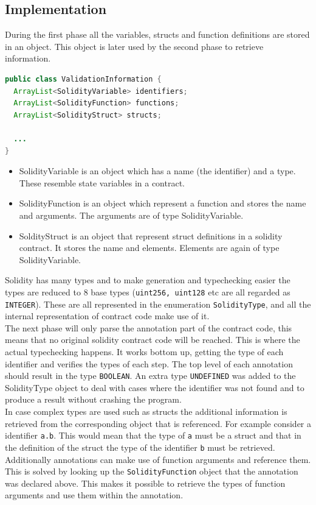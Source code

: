 \documentclass[a4paper]{article}
\begin{document}
\subsection{Implementation}
During the first phase all the variables, structs and function definitions are stored in an object. This object is later used by the second phase to retrieve information.
\begin{lstlisting}[breaklines=true, language=Java ]
public class ValidationInformation {
  ArrayList<SolidityVariable> identifiers;
  ArrayList<SolidityFunction> functions;
  ArrayList<SolidityStruct> structs;

  ...
}
\end{lstlisting}
\begin{itemize}
  \item SolidityVariable is an object which has a name (the identifier) and a type. These resemble state variables in a contract.
  \item SolidityFunction is an object which represent a function and stores the name and arguments. The arguments are of type SolidityVariable.
  \item SoldityStruct is an object that represent struct definitions in a solidity contract. It stores the name and elements. Elements are again of type SolidityVariable.
\end{itemize}
Solidity has many types and to make generation and typechecking easier the types are reduced to 8 base types (\texttt{uint256, uint128} etc are all regarded as \texttt{INTEGER}). These are all represented in the enumeration \texttt{SolidityType}, and all the internal representation of contract code make use of it. \\
The next phase will only parse the annotation part of the contract code, this means that no original solidity contract code will be reached. This is where the actual typechecking happens. It works bottom up, getting the type of each identifier and verifies the types of each step. The top level of each annotation should result in the type \texttt{BOOLEAN}. An extra type \texttt{UNDEFINED} was added to the SolidityType object to deal with cases where the identifier was not found and to produce a result without crashing the program. \\
In case complex types are used such as structs the additional information is retrieved from the corresponding object that is referenced. For example consider a identifier \texttt{a.b}. This would mean that the type of \texttt{a} must be a struct and that in the definition of the struct the type of the identifier \texttt{b} must be retrieved. Additionally annotations can make use of function arguments and reference them. This is solved by looking up the \texttt{SolidityFunction} object that the annotation was declared above. This makes it possible to retrieve the types of function arguments and use them within the annotation.
\end{document}
